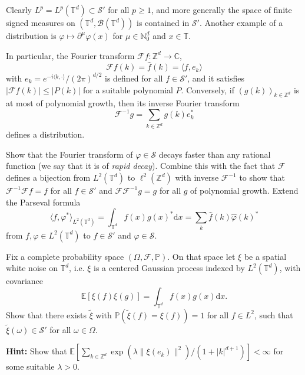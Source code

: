 \documentclass[a4paper,11pt]{article}
\newcommand{\cdummy}{\cdot}
\newcommand{\mathd}{\mathrm{d}}
\newcommand{\tmtextbf}[1]{{\bfseries{#1}}}
\newcommand{\tmtextit}[1]{{\itshape{#1}}}
\newcommand{\CB}{\mathscr{B}}
\newcommand{\CF}{\mathscr{F}}
\newcommand{\CS}{\mathscr{S}}
\begin{document}
\begin{example}
  Clearly $L^p = L^p (\mathbb{T}^d) \subset \CS'$ for all $p \geqslant 1$,
  and more generally the space of finite signed measures on $\left(
  \mathbb{T}^d, \mathcal{\CB} (\mathbb{T}^d) \right)$ is contained in
  $\CS'$. Another example of a distribution is $\varphi \mapsto
  \partial^{{\mu}} \varphi (x)$ for ${\mu} \in \mathbb{N}^d_0$ and $x
  \in \mathbb{T}$.
\end{example}

In particular, the Fourier transform $\CF f : \mathbb{Z}^d \rightarrow
\mathbb{C}$,
\[ \CF f (k) = \hat{f} (k) = \langle f, e_k \rangle \]
with $e_k = e^{- i \langle k, \cdummy \rangle} / (2 \pi)^{d / 2}$ is defined
for all $f \in \CS'$, and it satisfies $\left| \CF f (k) \right| \leqslant | P
(k) |$ for a suitable polynomial $P$. Conversely, if $(g (k))_{k \in
\mathbb{Z}^d}$ is at most of polynomial growth, then its inverse Fourier
transform
\[ \CF^{- 1} g = \sum_{k \in \mathbb{Z}^d} g (k) e_k^{\ast} \]
defines a distribution.

\begin{exercise}
  \label{exo:fourier inversion}Show that the Fourier transform of $\varphi \in
  \CS$ decays faster than any rational function (we say that it is of
  \tmtextit{rapid decay}). Combine this with the fact that $\CF$ defines a
  bijection from $L^2 (\mathbb{T}^d)$ to $\ell^2 (\mathbb{Z}^d)$ with
  inverse $\CF^{- 1}$ to show that $\CF^{- 1} \CF f = f$ for all $f \in \CS'$
  and $\CF \CF^{- 1} g = g$ for all $g$ of polynomial growth. Extend the
  Parseval formula
  \[ \langle f, \varphi^{\ast} \rangle_{L^2 (\mathbb{T}^d)} =
     \int_{\mathbb{T}^d} f (x) g (x)^{\ast} \mathd x = \sum_k \hat{f} (k)
     \hat{\varphi} (k)^{\ast} \]
  from $f, \varphi \in L^2 (\mathbb{T}^d)$ to $f \in \CS'$ and $\varphi \in
  \CS$.
\end{exercise}

\begin{exercise}
  \label{exo:wn}Fix a complete probability space $(\Omega, \mathcal{F},
  \mathbb{P})$. On that space let $\xi$ be a spatial white noise on
  $\mathbb{T}^d$, i.e. $\xi$ is a centered Gaussian process indexed by $L^2
  (\mathbb{T}^d)$, with covariance
  \[ \mathbb{E} [\xi (f) \xi (g)] = \int_{\mathbb{T}^d} f (x) g (x) \mathd
     x. \]
  Show that there exists $\tilde{\xi}$ with $\mathbb{P} (\tilde{\xi} (f) =
  \xi (f)) = 1$ for all $f \in L^2$, such that $\tilde{\xi} (\omega) \in \CS'$
  for all $\omega \in \Omega$.
  
  \tmtextbf{Hint:} Show that $\mathbb{E} \left[ \sum_{k \in \mathbb{Z}^d}
  \exp (\lambda \| \xi (e_k) \|^2) / (1 + | k |^{d + 1}) \right] < \infty$ for
  some suitable $\lambda > 0$. 
\end{exercise}
\end{document}
